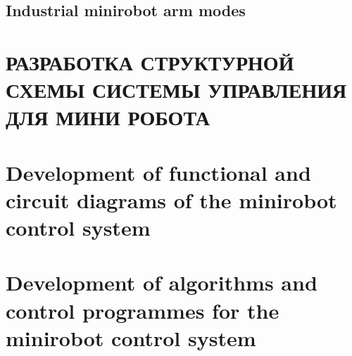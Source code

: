 \subsection{Industrial minirobot arm modes}



\section{РАЗРАБОТКА СТРУКТУРНОЙ СХЕМЫ СИСТЕМЫ УПРАВЛЕНИЯ ДЛЯ МИНИ РОБОТА}

\section{Development of functional and circuit diagrams of the minirobot control system}

\section{Development of algorithms and control programmes for the minirobot control system}



% 
